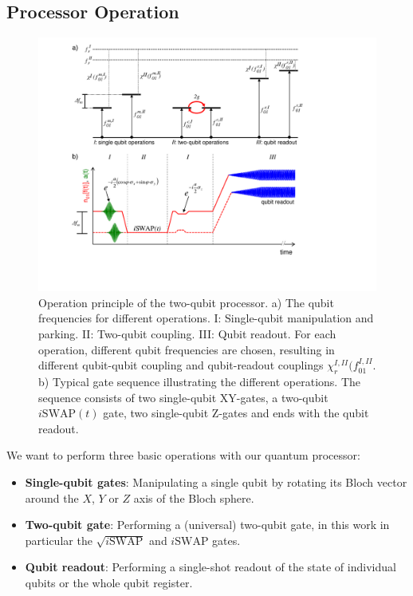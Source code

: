 \subsection{Processor Operation}

\begin{figure}[ht!]
	\centering
	\includegraphics[width=\textwidth]{./material/figures/2-qubit-processor/processor_working_principle}
	\caption[...]{Operation principle of the two-qubit processor. a) The qubit frequencies for different operations. I: Single-qubit manipulation and parking. II: Two-qubit coupling. III: Qubit readout. For each operation, different qubit frequencies are chosen, resulting in different qubit-qubit coupling and qubit-readout couplings $\chi_r^{I,II}(f_{01}^{I,II}$. b) Typical gate sequence illustrating the different operations. The sequence consists of two single-qubit XY-gates, a two-qubit $i\mathrm{SWAP}(t)$ gate, two single-qubit Z-gates and ends with the qubit readout.}
	\label{fig:processor_operation}
\end{figure}

We want to perform three basic operations with our quantum processor:

\begin{itemize}
\item \textbf{Single-qubit gates}: Manipulating a single qubit by rotating its Bloch vector around the $X$, $Y$ or $Z$ axis of the Bloch sphere.
\item \textbf{Two-qubit gate}: Performing a (universal) two-qubit gate, in this work in particular the $\sqrt{i\mathrm{SWAP}}$ and $i\mathrm{SWAP}$ gates.
\item \textbf{Qubit readout}: Performing a single-shot readout of the state of individual qubits or the whole qubit register.
\end{itemize}

